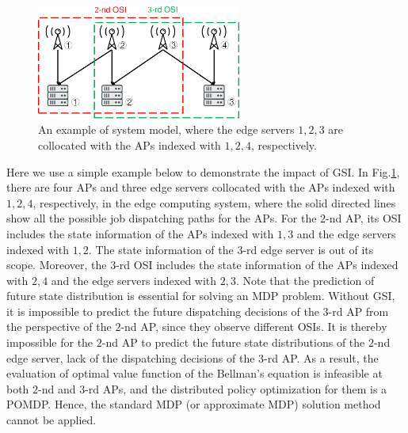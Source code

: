 \documentclass[12pt, onecolumn]{IEEEtran}
\theoremstyle{definition}             %
\theoremstyle{remark}                 %
\theoremstyle{plain}                  %
\begin{document}
{        %
        \begin{figure}[htp!]
            \centering
            \includegraphics[width=0.60\textwidth]{osi-example.pdf}
            \caption{An example of system model, where the edge servers $1,2,3$ are collocated with the APs indexed with $1,2,4$, respectively.}
            \label{fig:osi_example}
        \end{figure}
        Here we use a simple example below to demonstrate the impact of GSI.
        {%
            In Fig.\ref{fig:osi_example}, there are four APs and three edge servers collocated with the APs indexed with $1,2,4$, respectively, in the edge computing system, where the solid directed lines show all the possible job dispatching paths for the APs.
            For the $2$-nd AP, its OSI includes the state information of the APs indexed with $1,3$ and the edge servers indexed with $1,2$.
            The state information of the $3$-rd edge server is out of its scope.
            Moreover, the $3$-rd OSI includes the state information of the APs indexed with $2,4$ and the edge servers indexed with $2,3$.
        }%
        Note that the prediction of future state distribution is essential for solving an MDP problem.
        {%
            Without GSI, it is impossible to predict the future dispatching decisions of the $3$-rd AP from the perspective of the $2$-nd AP, since they observe different OSIs.
            It is thereby impossible for the $2$-nd AP to predict the future state distributions of the $2$-nd edge server, lack of the dispatching decisions of the $3$-rd AP.
            As a result, the evaluation of optimal value function of the Bellman's equation is infeasible at both $2$-nd and $3$-rd APs, and the distributed policy optimization for them is a POMDP.
        }%
        Hence, the standard MDP (or approximate MDP) solution method cannot be applied.

}
\end{document}
